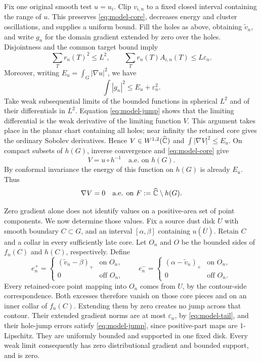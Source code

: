 Fix one original smooth test $u=u_i$.  Clip $v_{i,n}$ to a fixed
closed interval containing the range of $u$.  This preserves
\eqref{eq:model-core}, decreases energy and cluster oscillations,
and supplies a uniform bound.  Fill the holes as above, obtaining
$\widetilde v_n$, and write $g_n$ for the domain gradient extended by zero over the holes.
Disjointness and the common target bound imply
\[
 \sum_T r_n(T)^2\le L^2,\qquad
 \sum_T r_n(T)A_{i,n}(T)\le L\varepsilon_n.
\]
Moreover, writing $E_u=\int_G|\nabla u|^2$, we have
\begin{equation}\label{eq:model-energy-bound}
 \int|g_n|^2\le E_u+\varepsilon_n^2.
\end{equation}
Take weak subsequential limits of the bounded functions in spherical
$L^2$ and of their differentials in $L^2$.  Equation
\eqref{eq:model-jump} shows that the limiting differential is the weak
derivative of the limiting function $V$.  This argument takes place in
the planar chart containing all holes; near infinity the retained
core gives the ordinary Sobolev derivatives.  Hence
$V\in W^{1,2}(\widehat{\mathbb C})$ and $\int|\nabla V|^2\le E_u$.
On compact subsets of $h(G)$, inverse convergence and
\eqref{eq:model-core} give
\[
 V=u\circ h^{-1}\quad\text{a.e. on }h(G).
\]
By conformal invariance the energy of this function on $h(G)$ is
already $E_u$.  Thus
\begin{equation}\label{eq:model-energy-saturation}
 \nabla V=0\quad\text{a.e. on }F:=\widehat{\mathbb C}\setminus h(G).
\end{equation}

Zero gradient alone does not identify values on a positive-area set
of point components.  We now determine those values.  Fix a source
dust disk $U$ with smooth boundary $C\subset G$, and an interval
$[\alpha,\beta]$ containing $u(\overline U)$.  Retain $C$ and a collar
in every sufficiently late core.  Let $O_n$ and $O$ be the bounded
sides of $f_n(C)$ and $h(C)$, respectively.  Define
\[
 e_n^+=\begin{cases}(\widetilde v_n-\beta)_+&\text{on }O_n,\\
                         0&\text{off }O_n,\end{cases}
 \qquad
 e_n^-=\begin{cases}(\alpha-\widetilde v_n)_+&\text{on }O_n,\\
                         0&\text{off }O_n.\end{cases}
\]
Every retained-core point mapping into $O_n$ comes from $U$, by the
contour-side correspondence.  Both excesses therefore vanish on
those core pieces and on an inner collar of $f_n(C)$.  Extending them
by zero creates no jump across that contour.  Their extended gradient
norms are at most $\varepsilon_n$, by \eqref{eq:model-tail}, and their
hole-jump errors satisfy \eqref{eq:model-jump}, since positive-part
maps are $1$-Lipschitz.  They are uniformly bounded and supported in
one fixed disk.  Every weak limit consequently has zero
distributional gradient and bounded support, and is zero.

